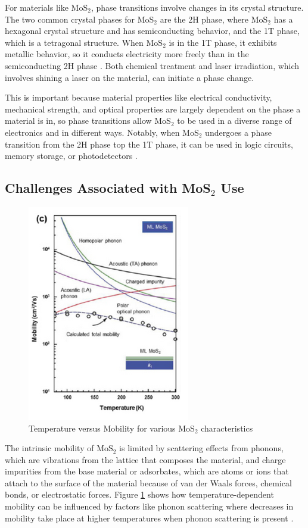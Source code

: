 \documentclass[conference]{IEEEtran}
\begin{document}
For materials like MoS$_2$, phase transitions involve changes in its crystal structure. The two common crystal phases for MoS$_2$ are the 2H phase, where MoS$_2$ has a hexagonal crystal structure and has semiconducting behavior, and the 1T phase, which is a tetragonal structure. When MoS$_2$ is in the 1T phase, it exhibits metallic behavior, so it conducts electricity more freely than in the semiconducting 2H phase \cite{oa4}. Both chemical treatment and laser irradiation, which involves shining a laser on the material, can initiate a phase change. 

This is important because material properties like electrical conductivity, mechanical strength, and optical properties are largely dependent on the phase a material is in, so phase transitions allow MoS$_2$ to be used in a diverse range of electronics and in different ways. Notably, when MoS$_2$ undergoes a phase transition from the 2H phase top the 1T phase, it can be used in logic circuits, memory storage, or photodetectors \cite{oa4}.

\subsection{Challenges Associated with MoS$_2$ Use}

\begin{figure}[h]
  \centering
  \includegraphics[width=.5\textwidth]{Figures/MOS2}
  \caption{Temperature versus Mobility for various MoS$_2$ characteristics \cite{oa5}}
  \label{fig:3}
\end{figure}

The intrinsic mobility of MoS$_2$ is limited by scattering effects from phonons, which are vibrations from the lattice that composes the material, and charge impurities from the base material or adsorbates, which are atoms or ions that attach to the surface of the material because of van der Waals forces, chemical bonds, or electrostatic forces. Figure \ref{fig:3} shows how temperature-dependent mobility can be influenced by factors like phonon scattering where decreases in mobility take place at higher temperatures when phonon scattering is present \cite{oa5}.
\end{document}
